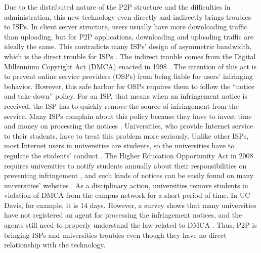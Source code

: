 \documentclass[12pt]{article}
\begin{document}
Due to the distributed nature of the P2P structure and the difficulties in administration, this new technology even directly and indirectly brings troubles to ISPs. In client server structure, users usually have more downloading traffic than uploading, but for P2P applications, downloading and uploading traffic are ideally the same. This contradicts many ISPs' design of asymmetric bandwidth, which is the direct trouble for ISPs \cite{01_KuroseJamesF2013Cn:a}. The indirect trouble comes from the Digital Millennium Copyright Act (DMCA) enacted in 1998 \cite{55_DMCA}. The intention of this act is to prevent online service providers (OSPs) from being liable for users' infringing behavior. However, this safe harbor for OSPs requires them to follow the ``notice and take down'' policy. For an ISP, that means when an infringement notice is received, the ISP has to quickly remove the source of infringement from the service. Many ISPs complain about this policy because they have to invest time and money on processing the notices \cite{30_HighEduAndDMCA}. 
Universities, who provide Internet service to their students, have to treat this problem more seriously. Unlike other ISPs, most Internet users in universities are students, so the universities have to regulate the students' conduct \cite{30_HighEduAndDMCA}. The Higher Education Opportunity Act in 2008 requires universities to notify students annually about their responsibilities on preventing infringement \cite{29_HighEduOppAct}, and such kinds of notices can be easily found on many universities' websites \cite{08_website:southtexascollege, 26_UCDavisDMCA, 28_CMU_DMCA}. As a disciplinary action, universities remove students in violation of DMCA from the campus network for a short period of time. In UC Davis, for example, it is 14 days. However, a survey shows that many universities have not registered an agent for processing the infringement notices, and the agents still need to properly understand the law related to DMCA \cite{30_HighEduAndDMCA}. Thus, P2P is bringing ISPs and universities troubles even though they have no direct relationship with the technology.
\end{document}
